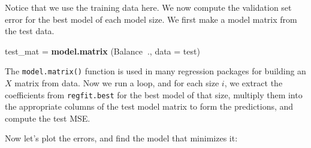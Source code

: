 \documentclass[
]{article}
\newenvironment{Shaded}{\begin{snugshade}}{\end{snugshade}}
\newcommand{\CommentTok}[1]{\textcolor[rgb]{0.56,0.35,0.01}{\textit{#1}}}
\newcommand{\ControlFlowTok}[1]{\textcolor[rgb]{0.13,0.29,0.53}{\textbf{#1}}}
\newcommand{\DataTypeTok}[1]{\textcolor[rgb]{0.13,0.29,0.53}{#1}}
\newcommand{\DecValTok}[1]{\textcolor[rgb]{0.00,0.00,0.81}{#1}}
\newcommand{\KeywordTok}[1]{\textcolor[rgb]{0.13,0.29,0.53}{\textbf{#1}}}
\newcommand{\NormalTok}[1]{#1}
\newcommand{\OperatorTok}[1]{\textcolor[rgb]{0.81,0.36,0.00}{\textbf{#1}}}
\newcommand{\OtherTok}[1]{\textcolor[rgb]{0.56,0.35,0.01}{#1}}
\newcommand{\StringTok}[1]{\textcolor[rgb]{0.31,0.60,0.02}{#1}}
\begin{document}
Notice that we use the training data here. We now compute the validation
set error for the best model of each model size. We first make a model
matrix from the test data.

\begin{Shaded}
\begin{Highlighting}[]
\NormalTok{test_mat =}\StringTok{ }\KeywordTok{model.matrix}\NormalTok{ (Balance}\OperatorTok{~}\NormalTok{., }\DataTypeTok{data =}\NormalTok{ test)}
\end{Highlighting}
\end{Shaded}

The \texttt{model.matrix()} function is used in many regression packages
for building an \(X\) matrix from data. Now we run a loop, and for each
size \(i\), we extract the coefficients from \texttt{regfit.best} for
the best model of that size, multiply them into the appropriate columns
of the test model matrix to form the predictions, and compute the test
MSE.

\begin{Shaded}
\end{Shaded}

Now let's plot the errors, and find the model that minimizes it:
\end{document}
